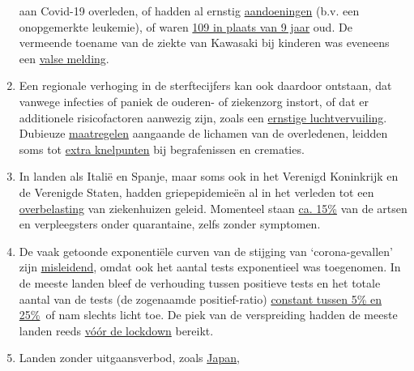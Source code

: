 \begin{enumerate}
  aan Covid-19 overleden, of hadden al ernstig
  \href{https://sports.yahoo.com/spanish-football-coach-francisco-garcia-163153573.html}{aandoeningen}
  (b.v. een onopgemerkte leukemie), of waren
  \href{https://www.n-tv.de/panorama/Neunjaehrige-Corona-Tote-war-109-Jahre-alt-article21753784.html}{109
  in plaats van 9 jaar} oud. De vermeende toename van de ziekte van
  Kawasaki bij kinderen was eveneens een
  \href{https://www.societi.org.uk/kawasaki-disease-covid-19/responding-to-press-coverage-28-april-2020/}{valse
  melding}.
\item
  Een regionale verhoging in de sterftecijfers kan ook daardoor
  ontstaan, ​​dat vanwege infecties of paniek de ouderen- of ziekenzorg
  instort, of dat er additionele risicofactoren aanwezig zijn, zoals een
  \href{https://www.heise.de/tp/features/Feinstaubpartikel-als-Viren-Vehikel-4687454.html}{ernstige
  luchtvervuiling}. Dubieuze
  \href{https://www.ecdc.europa.eu/sites/default/files/documents/COVID-19-safe-handling-of-bodies-or-persons-dying-from-COVID19.pdf}{maatregelen}
  aangaande de lichamen van de overledenen, leidden soms tot
  \href{https://www.globalresearch.ca/truth-behind-refrigerated-morgue-truck-stories/5711475}{extra
  knelpunten} bij begrafenissen en crematies.
\item
  In landen als Italië en Spanje, maar soms ook in het Verenigd
  Koninkrijk en de Verenigde Staten, hadden griepepidemieën al in het
  verleden tot een
  \href{https://off-guardian.org/2020/04/02/coronavirus-fact-check-1-flu-doesnt-overwhelm-our-hospitals/}{overbelasting}
  van ziekenhuizen geleid. Momenteel staan
  \href{https://www.nytimes.com/2020/03/24/world/europe/coronavirus-europe-covid-19.html}{ca.
  15\%} van de artsen en verpleegsters onder quarantaine, zelfs zonder
  symptomen.
\item
  De vaak getoonde exponentiële curven van de stijging van
  `corona-gevallen' zijn
  \href{https://multipolar-magazin.de/artikel/coronavirus-irrefuhrung-fallzahlen}{misleidend},
  omdat ook het aantal tests exponentieel was toegenomen. In de meeste
  landen bleef de verhouding tussen positieve tests en het totale aantal
  van de tests (de zogenaamde positief-ratio)
  \href{https://swprs.org/rate-of-positive-covid19-tests/}{constant
  tussen 5\% en 25\%}~of nam slechts licht toe. De piek van de
  verspreiding hadden de meeste landen reeds
  \href{https://infekt.ch/2020/04/sind-wir-tatsaechlich-im-blindflug/}{vóór
  de lockdown} bereikt.
\item
  Landen zonder uitgaansverbod, zoals
  \href{https://www.bloomberg.com/news/articles/2020-05-22/did-japan-just-beat-the-virus-without-lockdowns-or-mass-testing}{Japan},

\end{enumerate}
